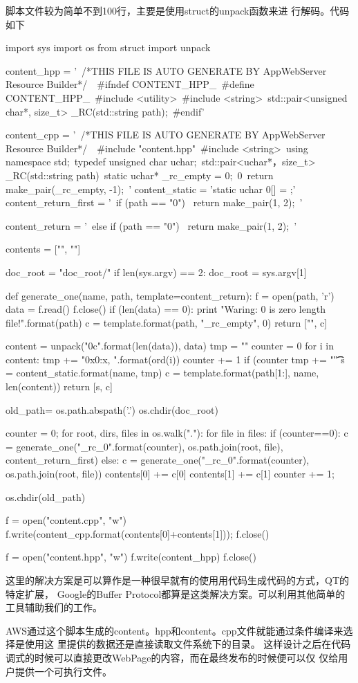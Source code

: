 脚本文件较为简单不到100行，主要是使用struct的unpack函数\cite{python}来进
行解码。代码如下
\begin{pythoncode}
import sys
import os
from struct import unpack

content_hpp =  '\
/*THIS FILE IS AUTO GENERATE BY AppWebServer Resource Builder*/\n\
\n\
#ifndef CONTENT_HPP_\n \
#define CONTENT_HPP_\n\
#include <utility>\n\
#include <string>\n\
std::pair<unsigned char*, size_t> _RC(std::string path);\n\
#endif\n'

content_cpp = '\
/*THIS FILE IS AUTO GENERATE BY AppWebServer Resource Builder*/\n\
\
#include "content.hpp"\n\
#include <string>\n\
using namespace std;\n\
typedef unsigned char uchar;\n\
	std::pair<uchar*，size_t> _RC(std::string path){{\n\
    static uchar* _rc_empty = 0;\n\
    {0}\n\
    return make_pair(_rc_empty, -1);\n\
}}'
content_static = 'static uchar {0}[] = {{ \n}};\n'
content_return_first = '\
if (path == "{0}") {{\n\
    return make_pair({1}, {2});\n\
}}'

content_return = '\
 else if (path == "{0}") {{\n\
   return make_pair({1}, {2});\n\
}}\n'

contents = ["", ""]

doc_root = "doc_root/"
if len(sys.argv) == 2:
    doc_root = sys.argv[1]

def generate_one(name, path, template=content_return):
    f = open(path, 'r')
    data = f.read()
    f.close()
    if (len(data) == 0):
        print "Waring: {0} is zero length file!".format(path)
        c = template.format(path, "_rc_empty", 0)
        return ["", c]

    content = unpack("{0}c".format(len(data)), data)
    tmp = ""
    counter = 0
    for i in content:
        tmp += "0x{0:x}, ".format(ord(i))
        counter += 1
        if (counter %
            tmp += "\n\t\t"
    s = content_static.format(name, tmp)
    c = template.format(path[1:], name, len(content))
    return [s, c]


old_path= os.path.abspath('.')
os.chdir(doc_root)

counter = 0;
for root, dirs, files in os.walk("."):
    for file in files:
        if (counter==0):
            c = generate_one("_rc_{0}".format(counter), 
			os.path.join(root, file), content_return_first)
        else:
            c = generate_one("_rc_{0}".format(counter), 
			os.path.join(root, file))
        contents[0] += c[0]
        contents[1] += c[1]
        counter += 1;

os.chdir(old_path)

f = open("content.cpp", "w")
f.write(content_cpp.format(contents[0]+contents[1]));
f.close()

f = open("content.hpp", "w")
f.write(content_hpp)
f.close()
\end{pythoncode}


这里的解决方案是可以算作是一种很早就有的使用用代码生成代码的方式，QT的特定扩展，
Google的Buffer Protocol都算是这类解决方案。可以利用其他简单的工具辅助我们的工作。

AWS通过这个脚本生成的content。hpp和content。cpp文件就能通过条件编译来选择是使用这
里提供的数据还是直接读取文件系统下的目录。
这样设计之后在代码调式的时候可以直接更改WebPage的内容，而在最终发布的时候便可以仅
仅给用户提供一个可执行文件。
